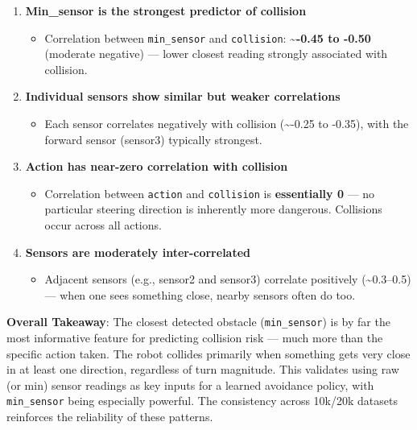 \begin{enumerate}
\item \textbf{Min\_sensor is the strongest predictor of collision}

\begin{itemize}
\item Correlation between \texttt{min\_sensor} and \texttt{collision}: \textbf{{\textasciitilde}-0.45 to -0.50} (moderate negative) --- lower closest reading strongly associated with collision.
\end{itemize}


\item \textbf{Individual sensors show similar but weaker correlations}

\begin{itemize}
\item Each sensor correlates negatively with collision ({\textasciitilde}-0.25 to -0.35), with the forward sensor (sensor3) typically strongest.
\end{itemize}


\item \textbf{Action has near-zero correlation with collision}

\begin{itemize}
\item Correlation between \texttt{action} and \texttt{collision} is \textbf{essentially 0} --- no particular steering direction is inherently more dangerous. Collisions occur across all actions.
\end{itemize}


\item \textbf{Sensors are moderately inter-correlated}

\begin{itemize}
\item Adjacent sensors (e.g., sensor2 and sensor3) correlate positively ({\textasciitilde}0.3--0.5) --- when one sees something close, nearby sensors often do too.
\end{itemize}
\end{enumerate}

\textbf{Overall Takeaway}:\newline
The closest detected obstacle (\texttt{min\_sensor}) is by far the most informative feature for predicting collision risk --- much more than the specific action taken. The robot collides primarily when something gets very close in at least one direction, regardless of turn magnitude. This validates using raw (or min) sensor readings as key inputs for a learned avoidance policy, with \texttt{min\_sensor} being especially powerful. The consistency across 10k/20k datasets reinforces the reliability of these patterns.

